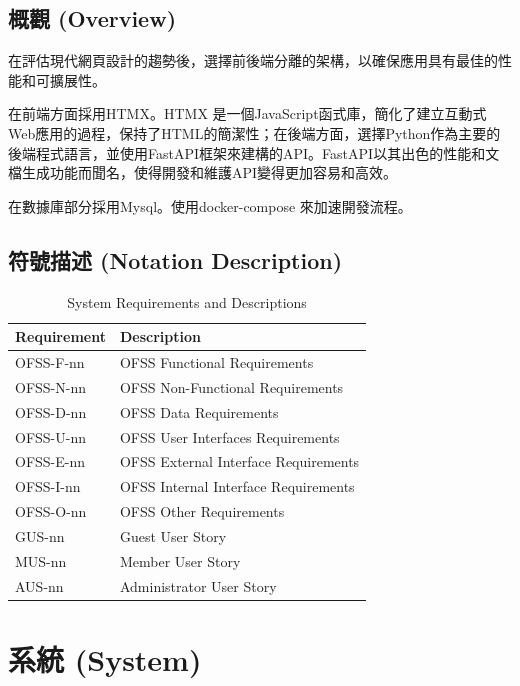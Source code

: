 \documentclass[a4paper, 12pt]{article}
\begin{document}
\subsection{概觀 (Overview)}
在評估現代網頁設計的趨勢後，選擇前後端分離的架構，以確保應用具有最佳的性能和可擴展性。

在前端方面採用HTMX。HTMX 是一個JavaScript函式庫，簡化了建立互動式Web應用的過程，保持了HTML的簡潔性；在後端方面，選擇Python作為主要的後端程式語言，並使用FastAPI框架來建構的API。FastAPI以其出色的性能和文檔生成功能而聞名，使得開發和維護API變得更加容易和高效。

在數據庫部分採用Mysql。使用docker-compose 來加速開發流程。

\subsection{符號描述 (Notation Description)}

\begin{table}[h]
    \centering
    \renewcommand{\arraystretch}{1.35}
    \begin{tabular}{|p{3cm}|p{10cm}|}
        \hline
        \textbf{Requirement} & \textbf{Description} \\
        \hline
        OFSS-F-nn & OFSS Functional Requirements \\
        \hline
        OFSS-N-nn & OFSS Non-Functional Requirements \\
        \hline
        OFSS-D-nn & OFSS Data Requirements \\
        \hline
        OFSS-U-nn & OFSS User Interfaces Requirements \\
        \hline
        OFSS-E-nn & OFSS External Interface Requirements \\
        \hline
        OFSS-I-nn & OFSS Internal Interface Requirements \\
        \hline
        OFSS-O-nn & OFSS Other Requirements \\
        \hline
        GUS-nn & Guest User Story \\
        \hline
        MUS-nn & Member User Story \\
        \hline
        AUS-nn & Administrator User Story \\
        \hline
    \end{tabular}
    \caption{System Requirements and Descriptions}
    \label{tab:system-requirements}
\end{table}
\newpage
\section{系統 (System)}
\end{document}
